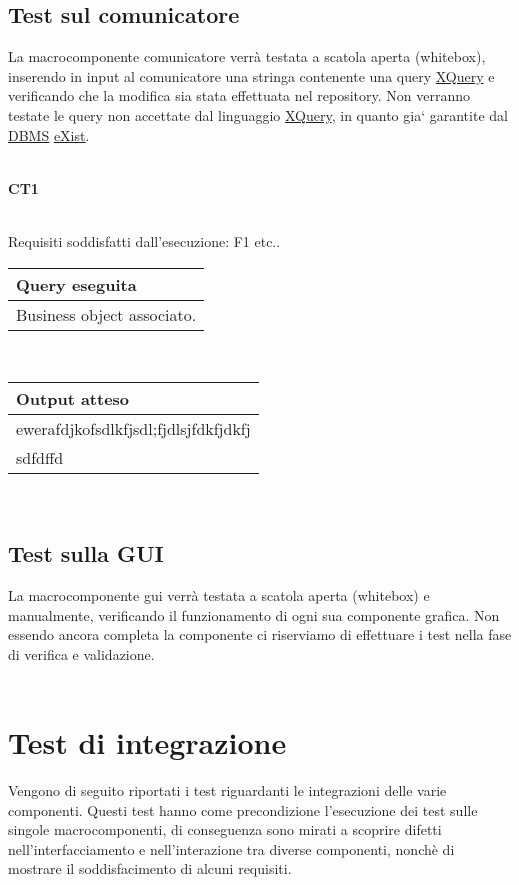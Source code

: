 \subsection{Test sul comunicatore}
La macrocomponente comunicatore verr\`a testata a scatola aperta (whitebox), inserendo in input al comunicatore una stringa contenente una query \underline{XQuery} e verificando che la modifica sia stata effettuata nel repository. Non verranno testate le query non accettate dal linguaggio \underline{XQuery}, in quanto gia` garantite dal \underline{DBMS} \underline{eXist}.\\
\\
\begin{Large}\textbf{CT1}\end{Large} \\
Requisiti soddisfatti dall'esecuzione: F1 etc..
\begin{center}
\begin{tabular}{|p{11cm}|} \hline
\textbf{Query eseguita}\\ \hline
Business object associato.\\ \hline
\end{tabular} \\
\end{center}
\begin{center}
\begin{tabular}{|p{11cm}|} \hline
\textbf{Output atteso}\\ \hline
ewerafdjkofsdlkfjsdl;fjdlsjfdkfjdkfj\\
sdfdffd\\
 \hline
\end{tabular} \\
\end{center}

\subsection{Test sulla GUI}
La macrocomponente gui verr\`a testata a scatola aperta (whitebox) e manualmente, verificando il funzionamento di ogni sua componente grafica. Non essendo ancora completa la componente ci riserviamo di effettuare i test nella fase di verifica e validazione.\\
\\

\section{Test di integrazione}
Vengono di seguito riportati i test riguardanti le integrazioni delle varie componenti. Questi test hanno come precondizione l'esecuzione dei test sulle singole macrocomponenti, di conseguenza sono mirati a scoprire difetti nell'interfacciamento e nell'interazione tra diverse componenti, nonch\`e di mostrare il soddisfacimento di alcuni requisiti.


